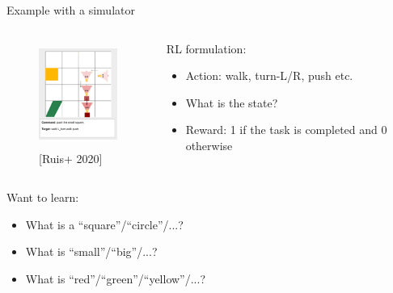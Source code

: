 \documentclass[usenames,dvipsnames,notes]{beamer}
\begin{document}
\begin{frame}
    {Example with a simulator}
    \begin{columns}
        \begin{column}{0.4\textwidth}
    \begin{figure}
        \includegraphics[height=3.5cm]{figures/instruction}
        \caption{[Ruis+ 2020]}
    \end{figure}
        \end{column}

        \begin{column}{0.6\textwidth}
            RL formulation:\\
    \begin{itemize}
        \item Action: walk, turn-L/R, push etc.
        \item What is the state? 
        \item Reward: 1 if the task is completed and 0 otherwise
    \end{itemize}
        \end{column}
    \end{columns}
    Want to learn:\\
    \begin{itemize}
        \item What is a ``square''/``circle''/...?
        \item What is ``small''/``big''/...?
        \item What is ``red''/``green''/``yellow''/...?
    \end{itemize}
\end{frame}
\end{document}
